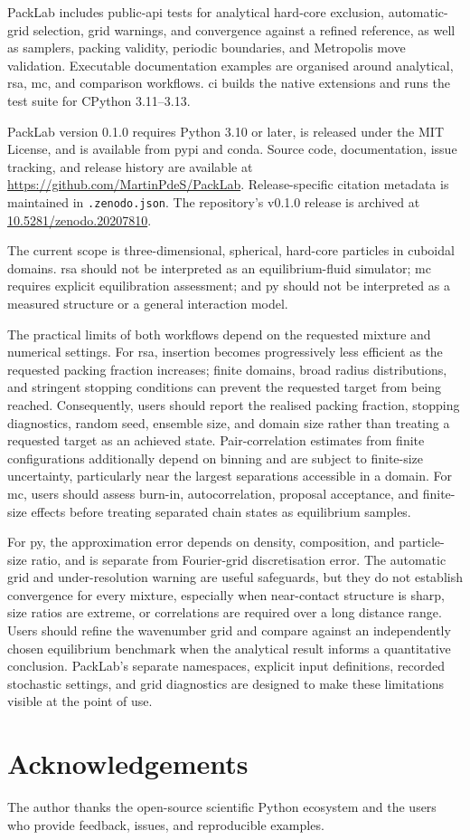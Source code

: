 \documentclass[11pt]{article}
\begin{document}
PackLab includes public-\gls{api} tests for analytical hard-core exclusion, automatic-grid selection, grid warnings, and convergence against a refined reference, as well as samplers, packing validity, periodic boundaries, and Metropolis move validation. %
Executable documentation examples are organised around analytical, \gls{rsa}, \gls{mc}, and comparison workflows. %
\Gls{ci} builds the native extensions and runs the test suite for CPython 3.11--3.13. %

PackLab version 0.1.0 requires Python 3.10 or later, is released under the MIT License, and is available from \gls{pypi} and conda. %
Source code, documentation, issue tracking, and release history are available at \url{https://github.com/MartinPdeS/PackLab}. %
Release-specific citation metadata is maintained in \texttt{.zenodo.json}. %
The repository's v0.1.0 release is archived at \href{https://doi.org/10.5281/zenodo.20207810}{10.5281/zenodo.20207810}. %

The current scope is three-dimensional, spherical, hard-core particles in cuboidal domains. %
\gls{rsa} should not be interpreted as an equilibrium-fluid simulator; \gls{mc} requires explicit equilibration assessment; and \gls{py} should not be interpreted as a measured structure or a general interaction model. %

The practical limits of both workflows depend on the requested mixture and numerical settings. %
For \gls{rsa}, insertion becomes progressively less efficient as the requested packing fraction increases; finite domains, broad radius distributions, and stringent stopping conditions can prevent the requested target from being reached. %
Consequently, users should report the realised packing fraction, stopping diagnostics, random seed, ensemble size, and domain size rather than treating a requested target as an achieved state. %
Pair-correlation estimates from finite configurations additionally depend on binning and are subject to finite-size uncertainty, particularly near the largest separations accessible in a domain. %
For \gls{mc}, users should assess burn-in, autocorrelation, proposal acceptance, and finite-size effects before treating separated chain states as equilibrium samples. %

For \gls{py}, the approximation error depends on density, composition, and particle-size ratio, and is separate from Fourier-grid discretisation error. %
The automatic grid and under-resolution warning are useful safeguards, but they do not establish convergence for every mixture, especially when near-contact structure is sharp, size ratios are extreme, or correlations are required over a long distance range. %
Users should refine the wavenumber grid and compare against an independently chosen equilibrium benchmark when the analytical result informs a quantitative conclusion. %
PackLab's separate namespaces, explicit input definitions, recorded stochastic settings, and grid diagnostics are designed to make these limitations visible at the point of use. %

\section{Acknowledgements}

The author thanks the open-source scientific Python ecosystem and the users who provide feedback, issues, and reproducible examples. %

\clearpage


\end{document}
